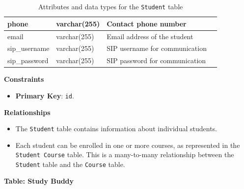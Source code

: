 \documentclass[12pt]{article}
\begin{document}
\begin{table}[H]
\begin{tabular}{|l|l|p{4.5cm}|l|}
    phone                & varchar(255)             & Contact phone number                                   &                                 \\ \hline
    email                & varchar(255)             & Email address of the student                           &                                 \\ \hline
    sip\_username        & varchar(255)             & SIP username for communication                         &                                 \\ \hline
    sip\_password        & varchar(255)             & SIP password for communication                         &                                 \\ \hline
    \end{tabular}
    \caption{Attributes and data types for the \texttt{Student} table}
\end{table}

\noindent
\textbf{Constraints}
\begin{itemize}
    \item \textbf{Primary Key}: \texttt{id}.
\end{itemize}

\noindent
\textbf{Relationships}
\begin{itemize}
    \item The \texttt{Student} table contains information about individual students.
    \item Each student can be enrolled in one or more courses, as represented in the \texttt{Student Course} table. This is a many-to-many relationship between the \texttt{Student} table and the \texttt{Course} table.
\end{itemize}

\textbf{Table: Study Buddy} \\
\end{document}
